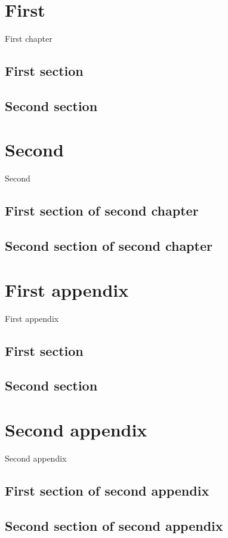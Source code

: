 \documentclass[oneside]{book}
\begin{document}
\doparttoc
\dominitoc
\tableofcontents
\mtcaddchapter %
\chapter{First}
\minitoc
First chapter
\section{First section}
\lipsum[1]
\section{Second section}
\lipsum[2]
\chapter{Second}
\minitoc
Second
\section{First section of second chapter}
\lipsum[3]
\section{Second section of second chapter}
\lipsum[4]
\appendix      %
\adjustptc     %
\parttoc       %
\begin{mtchideinmaintoc}[-1] %
\chapter{First appendix}
\minitoc
First appendix
\section{First section}
\lipsum[5]
\section{Second section}
\lipsum[6]
\chapter{Second appendix}
\minitoc
Second appendix
\section{First section of second appendix}
\lipsum[7]
\section{Second section of second appendix}
\lipsum[8]
\end{mtchideinmaintoc} %
\end{document}
